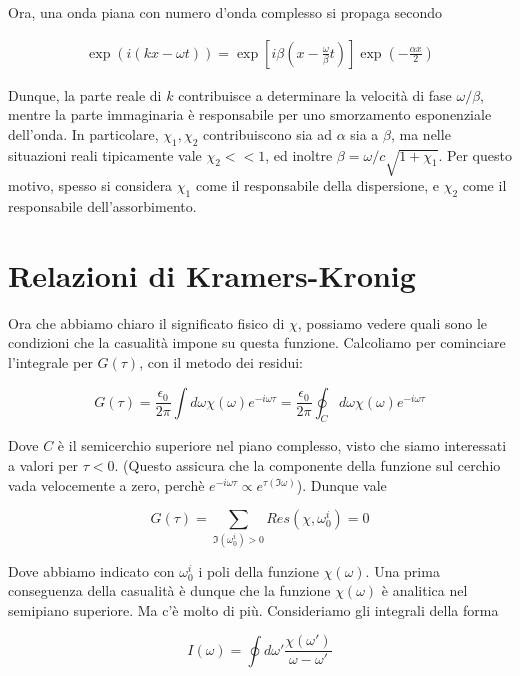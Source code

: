 \documentclass{report}
\begin{document}
Ora, una onda piana con numero d'onda complesso si propaga secondo 

\begin{align}
    \exp(i(kx - \omega t)) = \exp\left[i\beta\left(x - \frac{\omega}{\beta}t\right)\right]\exp\left(-\frac{\alpha x}{2}\right)
\end{align}

Dunque, la parte reale di \(k\) contribuisce a determinare la velocità di fase \(\omega/\beta\), mentre la parte immaginaria è responsabile per uno smorzamento esponenziale dell'onda. In particolare, \(\chi_1, \chi_2\) contribuiscono sia ad \(\alpha\) sia a \(\beta\), ma nelle situazioni reali tipicamente vale \(\chi_2 << 1\), ed inoltre \(\beta = \omega/c \sqrt{1+\chi_1}\). Per questo motivo, spesso si considera \(\chi_1\) come il responsabile della dispersione, e \(\chi_2\) come il responsabile dell'assorbimento.  

\section{Relazioni di Kramers-Kronig}

Ora che abbiamo chiaro il significato fisico di $\chi$, possiamo vedere quali sono le condizioni che la casualità impone su questa funzione. Calcoliamo per cominciare l'integrale per $G(\tau)$, con il metodo dei residui: 

\begin{equation}
    G(\tau) = \frac{\epsilon_0}{2\pi}\int d\omega \chi(\omega)e^{-i\omega \tau} = \frac{\epsilon_0 }{2\pi} \oint_C d\omega \chi(\omega) e^{-i\omega \tau} 
\end{equation}

Dove $C$ è il semicerchio superiore nel piano complesso, visto che siamo interessati a valori per $\tau <0$. (Questo assicura che la componente della funzione sul cerchio vada velocemente a zero, perchè $e^{-i\omega \tau } \propto e^{\tau(\Im{\omega})}$). Dunque vale 

\begin{equation}
    G(\tau) = \sum_{\Im(\omega_0^i)>0} Res(\chi, \omega_0^i) = 0
\end{equation}

Dove abbiamo indicato con $\omega_0^i$ i poli della funzione $\chi(\omega)$. Una prima conseguenza della casualità è dunque che la funzione $\chi(\omega)$ è analitica nel semipiano superiore. Ma c'è molto di più. Consideriamo gli integrali della forma 

\begin{equation}
    I(\omega) = \oint d\omega' \frac{\chi(\omega')}{\omega - \omega'}
\end{equation}
\end{document}
